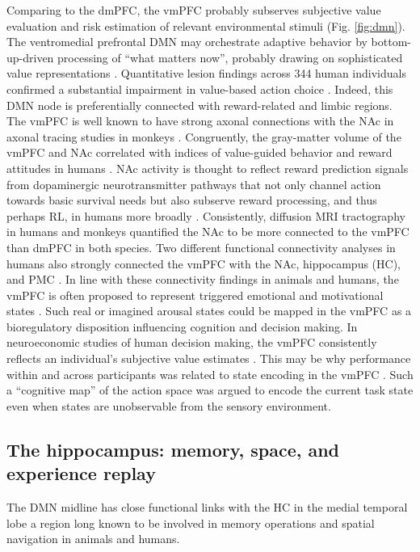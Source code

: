 \documentclass[10pt,letterpaper]{article}
\begin{document}
Comparing to the dmPFC,
the vmPFC probably subserves
subjective value evaluation and
risk estimation of relevant environmental stimuli
(Fig. \ref{fig:dmn}).
The ventromedial prefrontal DMN may
orchestrate adaptive behavior by bottom-up-driven
processing of “what matters now”,
probably drawing on sophisticated value representations
\citep{rolls_OFC, doherty2015structure}.
Quantitative lesion findings across 344 human individuals confirmed
a substantial impairment in value-based action choice
\citep{glascher2012lesion}.
Indeed,
this DMN node is preferentially connected with reward-related and limbic regions.
The vmPFC is well known to have strong axonal connections
with the NAc
in axonal tracing studies in monkeys \citep{haber1995orbital}.
Congruently, the gray-matter volume of the vmPFC and NAc
correlated with indices of value-guided behavior and reward attitudes
in humans
\citep{lebreton2009automatic}.
NAc activity is thought to reflect reward prediction signals
from dopaminergic neurotransmitter pathways
\citep{schultz1998predictive}
that not only channel action towards basic survival needs but also
subserve reward processing, and thus perhaps RL,
in humans more broadly \citep{doherty2015structure}.
Consistently, diffusion MRI tractography in humans and monkeys
\citep{croxson2005quantitative}
quantified the NAc to
be more connected to the vmPFC than dmPFC in both species.
Two different functional connectivity analyses in humans also strongly connected
the vmPFC with the NAc, hippocampus (HC),
and PMC \citep{bzdok2015subspecialization}.
%
In line with these connectivity findings in animals and humans,
the vmPFC is often proposed to represent triggered
emotional and motivational states \citep{damasio1996somatic}.
Such real or imagined arousal states could be mapped in the vmPFC
as a bioregulatory disposition influencing cognition
and decision making.
In neuroeconomic studies of human decision making,
the vmPFC consistently reflects an individual’s subjective
value estimates
\citep{behrens2008associative}.
This may be why performance within and across participants
was related to state encoding in the vmPFC \citep{Schuck2016}.
Such a ``cognitive map'' of the action space was argued to encode
the current task state even when states are unobservable from the sensory environment.




\subsection{The hippocampus: memory, space, and experience replay}
The DMN midline has close functional links
with the HC in the medial temporal lobe \citep{vincet2006, shannon2013morning} \textemdash
a region long known to be involved in
memory operations and spatial navigation in animals and humans.
\end{document}
